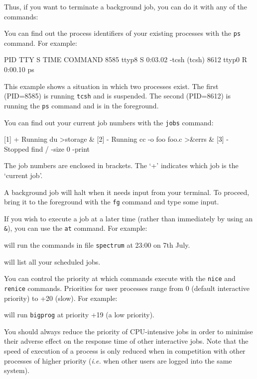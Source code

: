\documentclass[twoside,11pt,nolof]{starlink}
\begin{document}
Thus, if you want to terminate a background job, you can do it with any of
the commands:
\begin{terminalv}
\end{terminalv}
You can find out the process identifiers of your existing processes with the
\texttt{ps} command. For example:
\begin{terminalv}
   PID TTY      S           TIME COMMAND
  8585 ttyp8    S        0:03.02 -tcsh (tcsh)
  8612 ttyp0    R        0:00.10 ps
\end{terminalv}
This example shows a situation in which two processes exist.
The first (PID=8585) is running \texttt{tcsh} and is suspended.
The second (PID=8612) is running the \texttt{ps} command and is in the foreground.

You can find out your current job numbers with the \texttt{jobs} command:
\begin{terminalv}
[1] + Running    du >storage &
[2] - Running    cc -o foo foo.c >&errs &
[3] - Stopped    find / -size 0 -print
\end{terminalv}
The job numbers are enclosed in brackets.
The `+' indicates which job is the `current job'.

A background job will halt when it needs input from your terminal.
To proceed, bring it to the foreground with the \texttt{fg} command and type some
input.

If you wish to execute a job at a later time (rather than immediately by using
an \texttt{\&}), you can use the \texttt{at} command.
For example:
\begin{terminalv}
\end{terminalv}
will run the commands in file \texttt{spectrum} at 23:00 on 7th July.
\begin{terminalv}
\end{terminalv}
will list all your scheduled jobs.

You can control the priority at which commands execute with the \texttt{nice}
and \texttt{renice} commands.
Priorities for user processes range from 0 (default interactive priority)
to +20 (slow).
For example:
\begin{terminalv}
\end{terminalv}
will run \texttt{bigprog} at priority +19 (a low priority).

You should always reduce the priority of CPU-intensive jobs in order to minimise
their adverse effect on the response time of other interactive jobs.
Note that the speed of execution of a process is only reduced when in
competition with other processes of higher priority (\emph{i.e.}\/ when other
users are logged into the same system).
\end{document}
